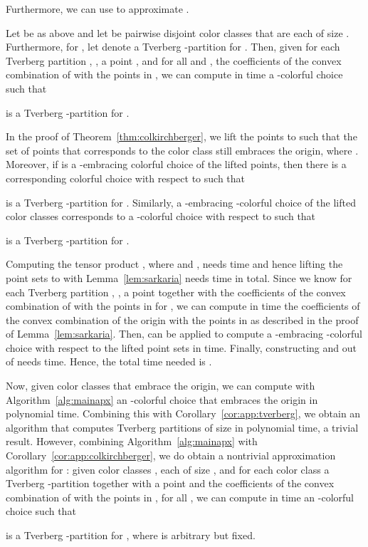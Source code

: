 Furthermore, we can use  to approximate \ColKirchberger.

\begin{corollary}\label{cor:app:colkirchberger}
Let  be as above and let  be
 pairwise disjoint color
classes that are each of size . Furthermore, for , let
 denote a Tverberg
-partition for .
Then, given for each Tverberg partition , , a 
point , and for all  and 
, the coefficients of the
convex combination of  with the points in ,
we can compute in  time a
-colorful choice  such that

is a Tverberg -partition for .
\end{corollary}
\begin{prf}
  In the proof of Theorem~\ref{thm:colkirchberger},
  we lift the points  to  such that the
  set of points  that corresponds to the color class 
  still
  embraces the origin, where . Moreover, if  is a -embracing colorful choice of the 
  lifted points, then there is a corresponding colorful choice  
  with respect to  such that

is a Tverberg -partition for .
Similarly, a -embracing -colorful choice  of the
lifted color classes corresponds to a -colorful choice  with 
respect to  such that

is a Tverberg -partition for .

Computing the tensor product , where 
 and , needs  time and hence
lifting the point sets  to  with
Lemma~\ref{lem:sarkaria} needs  time in total.
Since we know for each Tverberg partition , , a point
 together with the
coefficients of the convex combination of  with the points in 
 for , we can compute in  time the 
coefficients of the convex combination of the origin with the points 
in  as described in the proof of Lemma~\ref{lem:sarkaria}.
Then,  can be applied to compute a -embracing -colorful
choice  with respect to the lifted point sets in
 time. Finally, constructing  and  out of
 needs
 time. Hence, the total time needed is .
\end{prf}

Now, given  color classes  that 
embrace the origin, we can compute with Algorithm~\ref{alg:mainapx} an 
-colorful choice that embraces
the origin in polynomial time. Combining this
with Corollary~\ref{cor:app:tverberg},
we obtain an algorithm that computes Tverberg partitions of size 
 in polynomial time, a trivial result.
However, combining Algorithm~\ref{alg:mainapx} with
Corollary~\ref{cor:app:colkirchberger}, we do obtain a nontrivial 
approximation algorithm for \ColKirchberger: given  color classes , each of size , and for each
color class a Tverberg -partition 
 together with a
point  and the coefficients 
of the convex combination of  with the points in , for 
all , we can compute
in  time
an -colorful choice  such that

is a Tverberg -partition for , where  is arbitrary but 
fixed.
